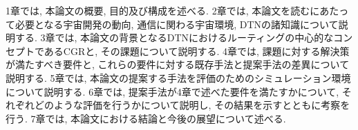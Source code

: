 1章では, 本論文の概要, 目的及び構成を述べる. 
2章では, 本論文を読むにあたって必要となる宇宙開発の動向, 通信に関わる宇宙環境, DTNの諸知識について説明する. 
3章では, 本論文の背景となるDTNにおけるルーティングの中心的なコンセプトであるCGRと, その課題について説明する.
4章では, 課題に対する解決策が満たすべき要件と, これらの要件に対する既存手法と提案手法の差異について説明する. 
5章では, 本論文の提案する手法を評価のためのシミュレーション環境について説明する. 
6章では, 提案手法が4章で述べた要件を満たすかについて, それぞれどのような評価を行うかについて説明し, その結果を示すとともに考察を行う. 
7章では, 本論文における結論と今後の展望について述べる.